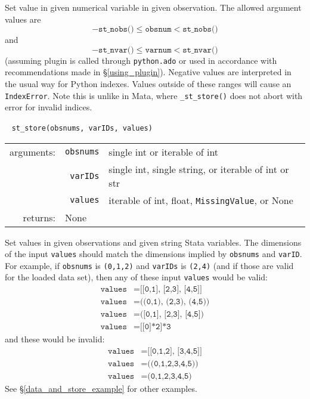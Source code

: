 \documentclass{article}
\begin{document}
			\vspace{1.5mm}
			\noindent Set value in given numerical variable in given observation. The allowed argument values are 
			\[
				-\texttt{st\_nobs()} \leq \texttt{obsnum} < \texttt{st\_nobs()}
			\]
			and
			\[
				-\texttt{st\_nvar()} \leq \texttt{varnum} < \texttt{st\_nvar()}
			\]
			(assuming plugin is called through \lstinline$python.ado$ or used in accordance with recommendations made in \S\ref{using_plugin}). Negative values are interpreted in the usual way for Python indexes. Values outside of these ranges will cause an \lstinline$IndexError$. Note this is unlike in Mata, where \lstinline{_st_store()} does not abort with error for invalid indices. \newline
			
			
			\ \newline
			\noindent \lstinline$st_store(obsnums, varIDs, values)$
								
			\vspace{1.5mm}
			\noindent 
			\indent \begin{tabular}{rrl}
					arguments: & \texttt{obsnums} & single int or iterable of int \\
						& \texttt{varIDs} & single int, single string, or iterable of int or str \\
						& \texttt{values} & iterable of int, float, \lstinline$MissingValue$, or None \\
					returns: & \multicolumn{2}{l}{None}
				\end{tabular}
								
			\vspace{1.5mm}
			\noindent Set values in given observations and given string Stata variables. The dimensions of the input \lstinline{values} should match the dimensions implied by \lstinline{obsnums} and \lstinline{varID}. For example, if \lstinline{obsnums} is \lstinline{(0,1,2)} and \lstinline{varIDs} is \lstinline{(2,4)} (and if those are valid for the loaded data set), then any of these input \lstinline{values} would be valid:
			\begin{align*}
				\texttt{values} &= \texttt{[[0,1], [2,3], [4,5]]} \\
				\texttt{values} &= \texttt{((0,1), (2,3), (4,5))} \\
				\texttt{values} &= \texttt{([0,1], [2,3], [4,5])} \\
				\texttt{values} &= \texttt{[[0]*2]*3}
			\end{align*}
			and these would be invalid:
			\begin{align*}
				\texttt{values} &= \texttt{[[0,1,2], [3,4,5]]} \\
				\texttt{values} &= \texttt{((0,1,2,3,4,5))} \\
				\texttt{values} &= \texttt{(0,1,2,3,4,5)}
			\end{align*}
See \S\ref{data_and_store_example} for other examples. 
			
\end{document}

